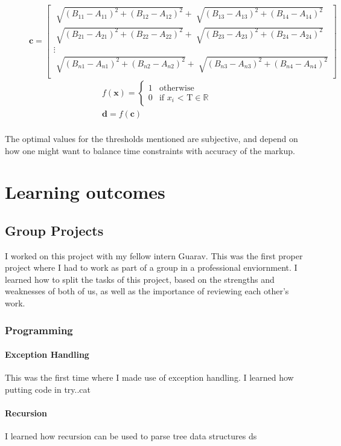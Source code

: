     \begin{figure}[h]
        \centering
        
        \[
        \pmb{c}=
        \begin{bmatrix}
            \sqrt[]{{(B_{11} - A_{11})}^2 + {(B_{12} - A_{12})}^2} + \sqrt[]{{(B_{13} - A_{13})}^2 + {(B_{14} - A_{14})}^2} \\
            \sqrt[]{{(B_{21} - A_{21})}^2 + {(B_{22} - A_{22})}^2} + \sqrt[]{{(B_{23} - A_{23})}^2 + {(B_{24} - A_{24})}^2} \\
            \vdots \\
            \sqrt[]{{(B_{n1} - A_{n1})}^2 + {(B_{n2} - A_{n2})}^2} + \sqrt[]{{(B_{n3} - A_{n3})}^2 + {(B_{n4} - A_{n4})}^2} \\
        \end{bmatrix}
        \]
        \begin{gather*}
            f(\pmb{x})=
        \begin{cases}
        1      & \text{otherwise}\\
        0      & \text{if $x_i$ < T} \in \mathbb{R} 
        \end{cases} \\
        \pmb{d} = f(\pmb{c}) \\
        \end{gather*}
        \caption{}
        \label{fig:roiprocessing}
    \end{figure} 

    The optimal values for the thresholds mentioned are subjective, and depend on how one might want to balance time constraints with accuracy of the markup.


\section{Learning outcomes}
    \subsection{Group Projects}
    I worked on this project with my fellow intern Guarav. This was the first proper project where I had to work as part of a group in a professional enviornment. I learned how to split the tasks of this project, based on the strengths and weaknesses of both of us, as well as the importance of reviewing each other's work.
    \subsubsection{Programming}
        \paragraph{Exception Handling}
        This was the first time where I made use of exception handling. I learned how putting code in try..cat
        \paragraph{Recursion}
        I learned how recursion can be used to parse tree data structures ds